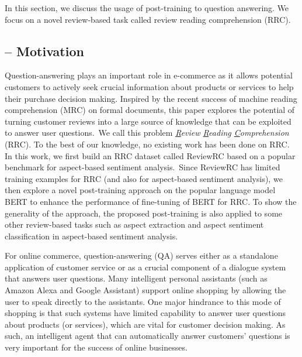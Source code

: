 In this section, we discuss the usage of post-training to question answering.
We focus on a novel review-based task called review reading comprehension (RRC).

\subsection{-- Motivation}
Question-answering plays an important role in e-commerce as it allows potential customers to actively seek crucial information about products or services to help their purchase decision making. 
Inspired by the recent success of machine reading comprehension (MRC) on formal documents, this paper explores the potential of turning customer reviews into a large source of knowledge that can be exploited to answer user questions.~We call this problem \textit{\underline{R}eview \underline{R}eading \underline{C}omprehension} (RRC). To the best of our knowledge, no existing work has been done on RRC. In this work, we first build an RRC dataset called ReviewRC based on a popular benchmark for aspect-based sentiment analysis.~Since ReviewRC has limited training examples for RRC (and also for aspect-based sentiment analysis), we then explore a novel post-training approach on the popular language model BERT to enhance the performance of fine-tuning of BERT for RRC.
To show the generality of the approach, the proposed post-training is also applied to some other review-based tasks such as aspect extraction and aspect sentiment classification in aspect-based sentiment analysis. 

For online commerce, question-answering (QA) serves either as a standalone application of customer service or as a crucial component of a dialogue system that answers user questions.
Many intelligent personal assistants (such as Amazon Alexa and Google Assistant) support online shopping by allowing the user to speak directly to the assistants. 
One major hindrance to this mode of shopping is that such systems have limited capability to answer user questions about products (or services), which are vital for customer decision making.
As such, an intelligent agent that can automatically answer customers' questions is very important for the success of online businesses.

